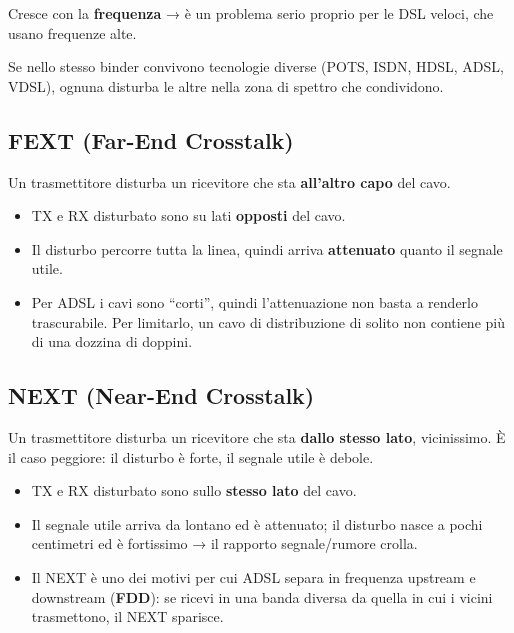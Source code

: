 Cresce con la \textbf{frequenza} → è un problema serio proprio per le DSL veloci, che usano frequenze alte.

Se nello stesso binder convivono tecnologie diverse (POTS, ISDN, HDSL, ADSL, VDSL), ognuna disturba le altre nella zona di spettro che condividono.

\subsection{FEXT (Far-End Crosstalk)}

\begin{inbreve}

Un trasmettitore disturba un ricevitore che sta \textbf{all'altro capo} del cavo.

\end{inbreve}

\begin{itemize}
\tightlist
\item
  TX e RX disturbato sono su lati \textbf{opposti} del cavo.
\item
  Il disturbo percorre tutta la linea, quindi arriva \textbf{attenuato} quanto il segnale utile.
\item
  Per ADSL i cavi sono ``corti'', quindi l'attenuazione non basta a renderlo trascurabile. Per limitarlo, un cavo di distribuzione di solito non contiene più di una dozzina di doppini.
\end{itemize}

\subsection{NEXT (Near-End Crosstalk)}

\begin{inbreve}

Un trasmettitore disturba un ricevitore che sta \textbf{dallo stesso lato}, vicinissimo. È il caso peggiore: il disturbo è forte, il segnale utile è debole.

\end{inbreve}

\begin{itemize}
\tightlist
\item
  TX e RX disturbato sono sullo \textbf{stesso lato} del cavo.
\item
  Il segnale utile arriva da lontano ed è attenuato; il disturbo nasce a pochi centimetri ed è fortissimo → il rapporto segnale/rumore crolla.
\item
  Il NEXT è uno dei motivi per cui ADSL separa in frequenza upstream e downstream (\textbf{FDD}): se ricevi in una banda diversa da quella in cui i vicini trasmettono, il NEXT sparisce.
\end{itemize}

